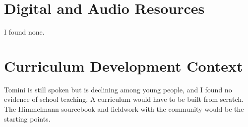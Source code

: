 \documentclass[12pt]{article}
\begin{document}
\section{Digital and Audio Resources}
I found none.

\section{Curriculum Development Context}
Tomini is still spoken but is declining among young people, and I found no evidence of school teaching. A curriculum would have to be built from scratch. The Himmelmann sourcebook and fieldwork with the community would be the starting points.
\end{document}
